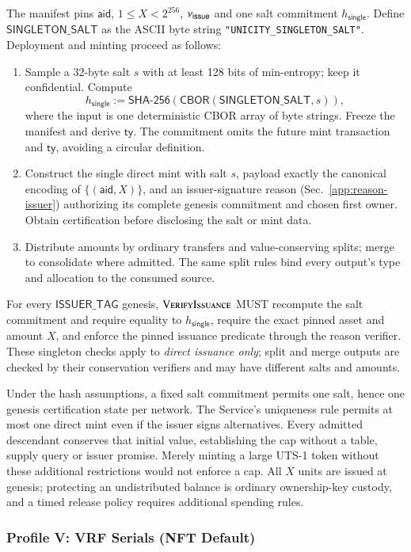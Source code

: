 The manifest pins $\mathsf{aid}$, $1 \le X < 2^{256}$, $\nu_\mathsf{issue}$ and one salt commitment $h_\mathsf{single}$. Define $\mathsf{SINGLETON\_SALT}$ as the ASCII byte string \texttt{"UNICITY\_SINGLETON\_SALT"}. Deployment and minting proceed as follows:
\begin{enumerate}
	\item Sample a 32-byte salt $s$ with at least 128 bits of min-entropy; keep it confidential. Compute
\[
h_\mathsf{single}:=\mathsf{SHA\text{-}256}(\mathsf{CBOR}(\mathsf{SINGLETON\_SALT},s)),
\]
where the input is one deterministic CBOR array of byte strings. Freeze the manifest and derive $\mathsf{ty}$. The commitment omits the future mint transaction and $\mathsf{ty}$, avoiding a circular definition.
	\item Construct the single direct mint with salt $s$, payload exactly the canonical encoding of $\{(\mathsf{aid},X)\}$, and an issuer-signature reason (Sec.~\ref{app:reason-issuer}) authorizing its complete genesis commitment and chosen first owner. Obtain certification before disclosing the salt or mint data.
	\item Distribute amounts by ordinary transfers and value-conserving splits; merge to consolidate where admitted. The same split rules bind every output's type and allocation to the consumed source.
\end{enumerate}

For every $\mathsf{ISSUER\_TAG}$ genesis, $\Call{VerifyIssuance}{}$ MUST recompute the salt commitment and require equality to $h_\mathsf{single}$, require the exact pinned asset and amount $X$, and enforce the pinned issuance predicate through the reason verifier. These singleton checks apply to \emph{direct issuance only}; split and merge outputs are checked by their conservation verifiers and may have different salts and amounts.

Under the hash assumptions, a fixed salt commitment permits one salt, hence one genesis certification state per network. The Service's uniqueness rule permits at most one direct mint even if the issuer signs alternatives. Every admitted descendant conserves that initial value, establishing the cap without a table, supply query or issuer promise. Merely minting a large UTS-1 token without these additional restrictions would not enforce a cap. All $X$ units are issued at genesis; protecting an undistributed balance is ordinary ownership-key custody, and a timed release policy requires additional spending rules.

\subsubsection{Profile V: VRF Serials (NFT Default)}\label{app:uts-vrf}

